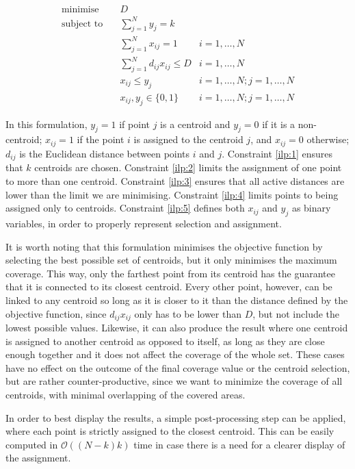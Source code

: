 \begin{align}
\text{minimise}   \quad& D				   &\\
\text{subject to} \quad
& \sum\limits_{j=1}^{N}{y_j} = k 
& 							\label{ilp:1}\\
& \sum\limits_{j=1}^{N}{x_{ij}}	= 1   
& i=1,\ldots,N 				\label{ilp:2}\\
& \sum\limits_{j=1}^{N}{d_{ij} x_{ij}} \leq D
& i=1,\ldots,N				\label{ilp:3}\\
& x_{ij} \leq y_{j}				   
& i=1,\ldots,N;j=1,\ldots,N	\label{ilp:4}\\
& x_{ij},y_{j} \in \{0,1\}
& i=1,\ldots,N;j=1,\ldots,N \label{ilp:5}
\end{align}

In this formulation, $y_j = 1$ if point $j$ is a centroid and $y_j = 0$ if it is a non-centroid;
$x_{ij} = 1$ if the point $i$ is assigned to the centroid $j$, and $x_{ij}=0$ otherwise;
$d_{ij}$ is the Euclidean distance between points $i$ and $j$.
Constraint \eqref{ilp:1} ensures that $k$ centroids are chosen.
Constraint \eqref{ilp:2} limits the assignment of one point to more than one centroid.
Constraint \eqref{ilp:3} ensures that all active distances are lower than the limit we are minimising.
Constraint \eqref{ilp:4} limits points to being assigned only to centroids.
Constraint \eqref{ilp:5} defines both $x_{ij}$ and $y_j$ as binary variables, in order to properly represent selection and assignment.

It is worth noting that this formulation minimises the objective function by selecting the best possible set of centroids, but it only minimises the maximum coverage. This way, only the farthest point from its centroid has the guarantee that it is connected to its closest centroid.
Every other point, however, can be linked to any centroid so long as it is closer to it than the distance defined by the objective function, since $d_{ij}x_{ij}$ only has to be lower than $D$, but not include the lowest possible values.
Likewise, it can also produce the result where one centroid is assigned to another centroid as opposed to itself, as long as they are close enough together and it does not affect the coverage of the whole set.
These cases have no effect on the outcome of the final coverage value or the centroid selection, but are rather counter-productive, since we want to minimize the coverage of all centroids, with minimal overlapping of the covered areas.

In order to best display the results, a simple post-processing step can be applied, where each point is strictly assigned to the closest centroid. This can be easily computed in $\mathcal{O}((N-k)k)$ time in case there is a need for a clearer display of the assignment.

